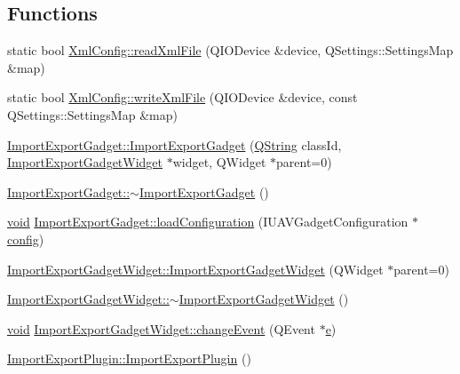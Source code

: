 \subsection*{Functions}
\begin{DoxyCompactItemize}
\item 
static bool \hyperlink{group__importexportplugin_gaaac43e2b7105e05bbc6c996a6d1e7944}{Xml\-Config\-::read\-Xml\-File} (Q\-I\-O\-Device \&device, Q\-Settings\-::\-Settings\-Map \&map)
\item 
static bool \hyperlink{group__importexportplugin_ga2e9b6064b59c93e1c7bebdce1a672d68}{Xml\-Config\-::write\-Xml\-File} (Q\-I\-O\-Device \&device, const Q\-Settings\-::\-Settings\-Map \&map)
\item 
\hyperlink{group__importexportplugin_ga449e9c18b4cda73ccd909194aa3485e5}{Import\-Export\-Gadget\-::\-Import\-Export\-Gadget} (\hyperlink{group___u_a_v_objects_plugin_gab9d252f49c333c94a72f97ce3105a32d}{Q\-String} class\-Id, \hyperlink{class_import_export_gadget_widget}{Import\-Export\-Gadget\-Widget} $\ast$widget, Q\-Widget $\ast$parent=0)
\item 
\hyperlink{group__importexportplugin_ga43425e89a61490abd203a67eb51a61e0}{Import\-Export\-Gadget\-::$\sim$\-Import\-Export\-Gadget} ()
\item 
\hyperlink{group___u_a_v_objects_plugin_ga444cf2ff3f0ecbe028adce838d373f5c}{void} \hyperlink{group__importexportplugin_gaffb56b3fb88f123af21ac597a514345a}{Import\-Export\-Gadget\-::load\-Configuration} (I\-U\-A\-V\-Gadget\-Configuration $\ast$\hyperlink{deflate_8c_a4473b5227787415097004fd39f55185e}{config})
\item 
\hyperlink{group__importexportplugin_gaa6f8e207b497782f1c00bebfcdf362e6}{Import\-Export\-Gadget\-Widget\-::\-Import\-Export\-Gadget\-Widget} (Q\-Widget $\ast$parent=0)
\item 
\hyperlink{group__importexportplugin_ga96b1b166720e190f43ce5a83b0440ba8}{Import\-Export\-Gadget\-Widget\-::$\sim$\-Import\-Export\-Gadget\-Widget} ()
\item 
\hyperlink{group___u_a_v_objects_plugin_ga444cf2ff3f0ecbe028adce838d373f5c}{void} \hyperlink{group__importexportplugin_gac24ae66f22b367d4a3854a11092b6732}{Import\-Export\-Gadget\-Widget\-::change\-Event} (Q\-Event $\ast$\hyperlink{_o_p_plots_8m_a9425be9aab51621e317ba7ade564b570}{e})
\item 
\hyperlink{group__importexportplugin_ga925c9f27737044548e1b28010361c41b}{Import\-Export\-Plugin\-::\-Import\-Export\-Plugin} ()
\item 

\end{DoxyCompactItemize}
